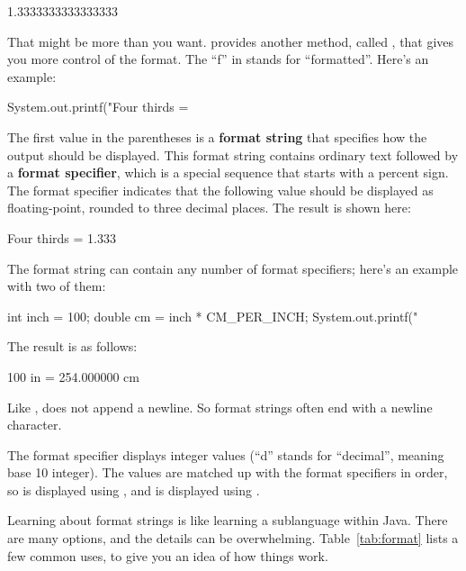 \begin{stdout}
1.3333333333333333
\end{stdout}


That might be more than you want.
 provides another method, called , that gives you more control of the format.
The ``f'' in  stands for ``formatted''.
Here's an example:

\begin{code}
System.out.printf("Four thirds = %
\end{code}


The first value in the parentheses is a {\bf format string} that specifies how the output should be displayed.
This format string contains ordinary text followed by a {\bf format specifier}, which is a special sequence that starts with a percent sign.
The format specifier  indicates that the following value should be displayed as floating-point, rounded to three decimal places.
The result is shown here:

\begin{stdout}
Four thirds = 1.333
\end{stdout}

The format string can contain any number of format specifiers; here's an example with two of them:

\begin{code}
int inch = 100;
double cm = inch * CM_PER_INCH;
System.out.printf("%
\end{code}

The result is as follows:

\begin{stdout}
100 in = 254.000000 cm
\end{stdout}

Like ,  does not append a newline.
So format strings often end with a newline character.

The format specifier  displays integer values (``d'' stands for ``decimal'', meaning base 10 integer).
The values are matched up with the format specifiers in order, so  is displayed using , and  is displayed using .

Learning about format strings is like learning a sublanguage within Java.
There are many options, and the details can be overwhelming.
Table~\ref{tab:format} lists a few common uses, to give you an idea of how things work.

